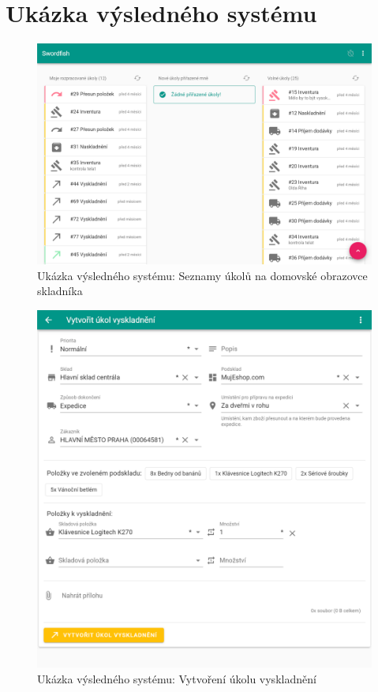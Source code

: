 \chapter{Ukázka výsledného systému} \label{ap:demo}

\begin{figure}[]
\includegraphics[width=\textwidth]{../png/app/demo1.png}
\caption{Ukázka výsledného systému: Seznamy úkolů na domovské obrazovce skladníka} \label{picture:demo1}
\end{figure}

\begin{figure}[]
\includegraphics[width=\textwidth]{../png/app/demo2.png}
\caption{Ukázka výsledného systému: Vytvoření úkolu vyskladnění} \label{picture:demo2}
\end{figure}

